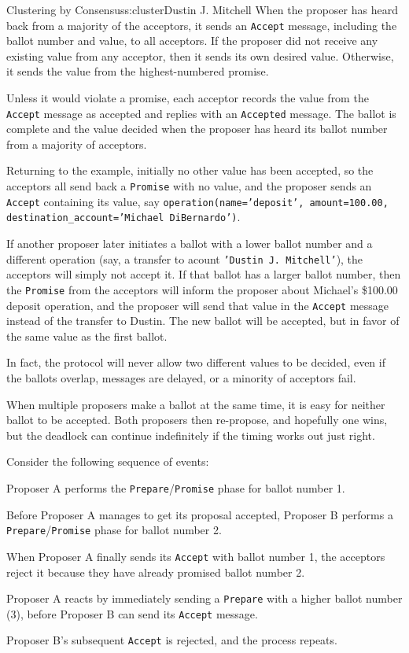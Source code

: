 \begin{aosachapter}{Clustering by Consensus}{s:cluster}{Dustin J. Mitchell}
When the proposer has heard back from a majority of the acceptors, it
sends an \texttt{Accept} message, including the ballot number and value,
to all acceptors. If the proposer did not receive any existing value
from any acceptor, then it sends its own desired value. Otherwise, it
sends the value from the highest-numbered promise.

Unless it would violate a promise, each acceptor records the value from
the \texttt{Accept} message as accepted and replies with an
\texttt{Accepted} message. The ballot is complete and the value decided
when the proposer has heard its ballot number from a majority of
acceptors.

Returning to the example, initially no other value has been accepted, so
the acceptors all send back a \texttt{Promise} with no value, and the
proposer sends an \texttt{Accept} containing its value, say
\texttt{operation(name='deposit', amount=100.00, destination\_account='Michael DiBernardo')}.

If another proposer later initiates a ballot with a lower ballot number
and a different operation (say, a transfer to acount
\texttt{'Dustin J. Mitchell'}), the acceptors will simply not accept it.
If that ballot has a larger ballot number, then the \texttt{Promise}
from the acceptors will inform the proposer about Michael's \$100.00
deposit operation, and the proposer will send that value in the
\texttt{Accept} message instead of the transfer to Dustin. The new
ballot will be accepted, but in favor of the same value as the first
ballot.

In fact, the protocol will never allow two different values to be
decided, even if the ballots overlap, messages are delayed, or a
minority of acceptors fail.

When multiple proposers make a ballot at the same time, it is easy for
neither ballot to be accepted. Both proposers then re-propose, and
hopefully one wins, but the deadlock can continue indefinitely if the
timing works out just right.

Consider the following sequence of events:

\begin{aosaitemize}

\item
  Proposer A performs the \texttt{Prepare}/\texttt{Promise} phase for
  ballot number 1.
\item
  Before Proposer A manages to get its proposal accepted, Proposer B
  performs a \texttt{Prepare}/\texttt{Promise} phase for ballot number
  2.
\item
  When Proposer A finally sends its \texttt{Accept} with ballot number
  1, the acceptors reject it because they have already promised ballot
  number 2.
\item
  Proposer A reacts by immediately sending a \texttt{Prepare} with a
  higher ballot number (3), before Proposer B can send its
  \texttt{Accept} message.
\item
  Proposer B's subsequent \texttt{Accept} is rejected, and the process
  repeats.
\end{aosaitemize}


\end{aosachapter}
